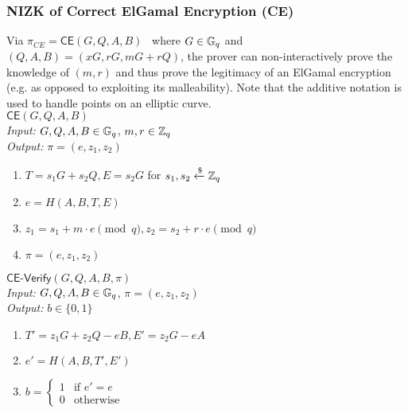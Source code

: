 \subsubsection{NIZK of Correct ElGamal Encryption (CE)}
\label{appendix:ce}
Via $\pi_{CE} = \mathsf{CE}(G, Q, A, B)$~\cite{cherniaeva2019homomorphic} where $G \in \mathbb{G}_q$ and $(Q, A, B) = (x G, r G, m G + r Q)$, the prover can non-interactively prove the knowledge of $(m, r)$ and thus prove the legitimacy of an ElGamal encryption (e.g. as opposed to exploiting its malleability). Note that the additive notation is used to handle points on an elliptic curve.\\

\noindent\underline{$\mathsf{CE}(G, Q, A, B)$}\\
\textit{Input:} $G, Q, A, B \in \mathbb{G}_q$, $m, r \in \mathbb{Z}_q$\\
\textit{Output:} $\pi = (e, z_1, z_2)$
\vspace{-\topsep}
\begin{enumerate}
\item $T = s_1 G + s_2 Q, E = s_2 G$ for $s_1, s_2 \xleftarrow{\$} \mathbb{Z}_q$
\item $e = H(A, B, T, E)$
\item $z_1 = s_1 + m \cdot e \pmod q, z_2 = s_2 + r \cdot e \pmod q$
\item $\pi = (e, z_1, z_2)$
\end{enumerate}

\noindent\underline{$\mathsf{CE}\text{-}\mathsf{Verify}(G, Q, A, B, \pi)$}\\
\textit{Input:} $G, Q, A, B \in \mathbb{G}_q$, $\pi = (e, z_1, z_2)$\\
\textit{Output:} $b \in \{0, 1\}$
\vspace{-\topsep}
\begin{enumerate}
\item $T' = z_1 G + z_2 Q - e B, E' = z_2 G - e A$
\item $e' = H(A, B, T', E')$
\item $b = \begin{cases}
1 & \text{if $e' = e$}\\
0 & \text{otherwise}
\end{cases}$
\end{enumerate}
